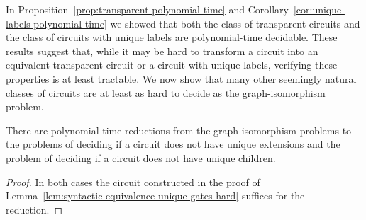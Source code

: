 \documentclass[../paper.tex]{subfiles}
\begin{document}




In Proposition~\ref{prop:transparent-polynomial-time} and
Corollary~\ref{cor:unique-labels-polynomial-time} we showed that both the class
of transparent circuits and the class of circuits with unique labels are
polynomial-time decidable. These results suggest that, while it may be hard to
transform a circuit into an equivalent transparent circuit or a circuit with
unique labels, verifying these properties is at least tractable. We now show
that many other seemingly natural classes of circuits are at least as hard to
decide as the graph-isomorphism problem.

\begin{lem}
  There are polynomial-time reductions from the graph isomorphism problems to
  the problems of deciding if a circuit does not have unique extensions and the
  problem of deciding if a circuit does not have unique children.
  \label{lem:unique-extensions-hard}
\end{lem}
\begin{proof}
  In both cases the circuit constructed in the proof of
  Lemma~\ref{lem:syntactic-equivalence-unique-gates-hard} suffices for the
  reduction.
\end{proof}


\end{document}
